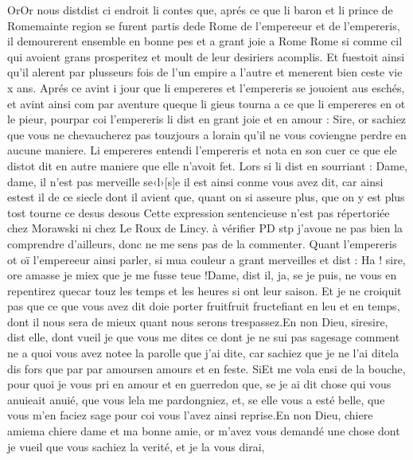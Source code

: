 \documentclass{article}
\begin{document}
\begin{pages}
            
\pstart OrOr nous 
   distdist ci endroit li contes que, 
   aprés ce que li baron et li prince de 
   Romemainte region se furent partis 
   dede Rome de 
   l’empereeur et de l’empereris, 
   il demourerent ensemble en bonne pes et a grant joie a Rome
      Rome si comme cil qui avoient grans prosperitez et moult de leur desiriers acomplis. 
   Et fuestoit ainsi qu’il alerent par plusseurs fois de l’un empire a l’autre 
   et menerent bien ceste vie x ans. 
   Aprés ce avint i jour que li empereres et 
   l’empereris se jouoient aus eschés, et avint ainsi com par aventure 
   queque li gieus tourna a ce que 
   li empereres en ot le pieur, pourpar 
   coi l’empereris li dist en grant joie et en amour :
   Sire, or sachiez que vous ne chevaucherez pas touzjours a 
   lorain qu’il ne vous coviengne perdre en aucune maniere.
   Li empereres entendi l’empereris 
   et nota en son cuer ce que ele 
   distot dit en autre maniere que elle n’avoit fet. Lors si li dist 
   en sourriant :
   Dame, dame, il n’est pas merveille 
      se‹l›[s]e il est ainsi conme vous avez dit, 
      car ainsi estest il de ce siecle dont il avient que, 
   quant on si asseure plus, que on y est plus tost tourne ce desus desous
      Cette 
         expression sentencieuse n'est pas répertoriée chez Morawski ni chez Le Roux de Lincy. à vérifier PD stp j'avoue ne pas bien la 
      comprendre d'ailleurs, donc ne me sens pas de la commenter. \pend
\pstart Quant l’empereris ot oï
   l’empereeur ainsi parler, si mua couleur a grant merveilles et dist :
   Ha ! sire, ore amasse je miex que je me fusse teue !Dame, dist il, ja, se je puis, ne vous en repentirez 
      quecar touz les temps 
      et les heures si ont leur saison. Et je ne croiquit pas que ce que vous 
      avez dit doie porter fruitfruit fructefiant en leu et en temps,
      dont il nous sera de mieux quant nous serons trespassez.En non Dieu, siresire, dist elle, 
      dont vueil je que vous me dites ce dont je ne sui pas 
      sagesage comment ne a quoi vous avez notee la parolle que j’ai dite, 
      car sachiez que je ne l’ai ditela dis 
      fors 
      que par 
      par amoursen amours et en feste. 
      SiEt me vola ensi de la bouche, pour quoi je vous pri en amour et en guerredon que, 
      se je ai dit chose qui vous anuieait anuié, 
      que vous lela me pardongniez, et, se elle vous a esté belle, 
               que vous m’en faciez sage pour coi vous l’avez ainsi reprise.En non Dieu, 
      chiere amiema chiere dame et ma bonne amie, 
      or m’avez vous demandé une chose 
               dont je vueil que vous sachiez la verité, et je la vous dirai, 

\end{pages}
\end{document}
